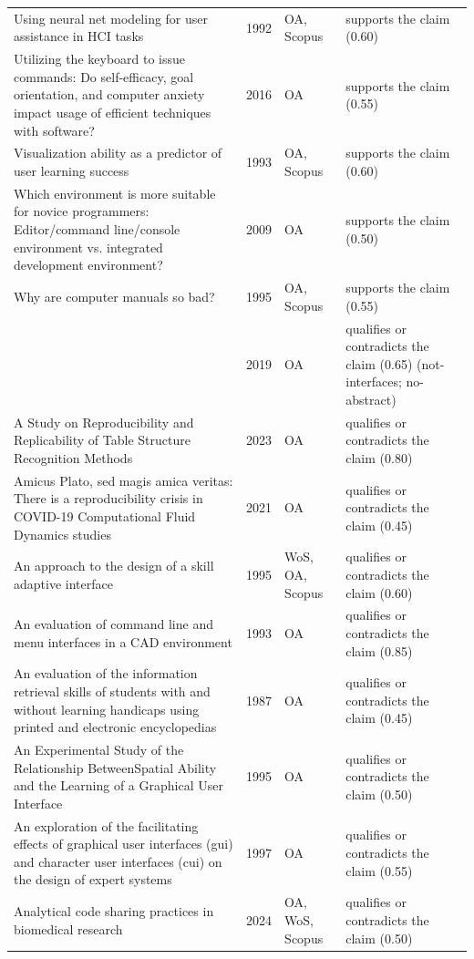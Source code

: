 \begin{longtable}{@{}%
  >{\raggedright\arraybackslash}p{}c%
  >{\raggedright\arraybackslash}p{}%
  >{\raggedright\arraybackslash}p{}@{}}
Using neural net modeling for user assistance in HCI tasks & 1992 & OA, Scopus & supports the claim (0.60) \\
Utilizing the keyboard to issue commands: Do self-efficacy, goal orientation, and computer anxiety impact usage of efficient techniques with software? & 2016 & OA & supports the claim (0.55) \\
Visualization ability as a predictor of user learning success & 1993 & OA, Scopus & supports the claim (0.60) \\
Which environment is more suitable for novice programmers: Editor/command line/console environment vs. integrated development environment? & 2009 & OA & supports the claim (0.50) \\
Why are computer manuals so bad? & 1995 & OA, Scopus & supports the claim (0.55) \\
 & 2019 & OA & qualifies or contradicts the claim (0.65) (not-interfaces; no-abstract) \\
A Study on Reproducibility and Replicability of Table Structure Recognition Methods & 2023 & OA & qualifies or contradicts the claim (0.80) \\
Amicus Plato, sed magis amica veritas: There is a reproducibility crisis in COVID-19 Computational Fluid Dynamics studies & 2021 & OA & qualifies or contradicts the claim (0.45) \\
An approach to the design of a skill adaptive interface & 1995 & WoS, OA, Scopus & qualifies or contradicts the claim (0.60) \\
An evaluation of command line and menu interfaces in a CAD environment & 1993 & OA & qualifies or contradicts the claim (0.85) \\
An evaluation of the information retrieval skills of students with and without learning handicaps using printed and electronic encyclopedias & 1987 & OA & qualifies or contradicts the claim (0.45) \\
An Experimental Study of the Relationship BetweenSpatial Ability and the Learning of a Graphical User Interface & 1995 & OA & qualifies or contradicts the claim (0.50) \\
An exploration of the facilitating effects of graphical user interfaces (gui) and character user interfaces (cui) on the design of expert systems & 1997 & OA & qualifies or contradicts the claim (0.55) \\
Analytical code sharing practices in biomedical research & 2024 & OA, WoS, Scopus & qualifies or contradicts the claim (0.50) \\

\end{longtable}

